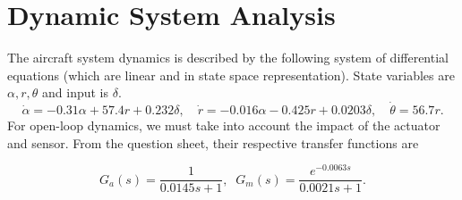 \documentclass[9pt,a4paper]{article}
\begin{document}
    \thispagestyle{empty}
    \section{Dynamic System Analysis} \label{Sec1}
    The aircraft system dynamics is described by the following system of differential equations (which are linear and in state space representation). State variables are $\alpha, r, \theta$ and input is $\delta$.
    \begin{equation*}
        \dot{\alpha} = -0.31\alpha + 57.4r +0.232\delta, \quad
        \dot{r} = -0.016\alpha-0.425r+0.0203\delta, \quad
        \dot{\theta} = 56.7r.
    \end{equation*}
    For open-loop dynamics, we must take into account the impact of the actuator and sensor. From the question sheet, their respective transfer functions are

    $$G_{a}(s)=\frac{1}{0.0145s+1}, \; \; G_{m}(s)=\frac{e^{-0.0063s}}{0.0021s+1}.$$
    
\end{document}
